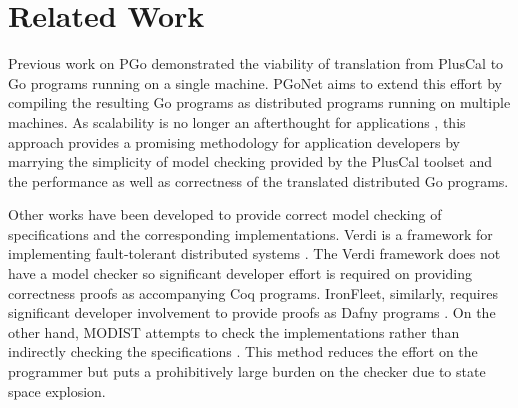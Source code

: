 \section{Related Work}

Previous work on PGo \cite{Zhang:2016} demonstrated the viability of translation from PlusCal to Go programs running on a single machine. PGoNet aims to extend this effort by compiling the resulting Go programs as distributed programs running on multiple machines. As scalability is no longer an afterthought for applications \cite{Cavage:2013}, this approach provides a promising methodology for application developers by marrying the simplicity of model checking provided by the PlusCal toolset and the performance as well as correctness of the translated distributed Go programs.

Other works have been developed to provide correct model checking of specifications and the corresponding implementations. Verdi is a framework for implementing fault-tolerant distributed systems \cite{Wilcox:2015}. The Verdi framework does not have a model checker so significant developer effort is required on providing correctness proofs as accompanying Coq programs. IronFleet, similarly, requires significant developer involvement to provide proofs as Dafny programs \cite{Hawblitzel:2015}. On the other hand, MODIST attempts to check the implementations rather than indirectly checking the specifications \cite{Yang:2009}. This method reduces the effort on the programmer but puts a prohibitively large burden on the checker due to state space explosion.
